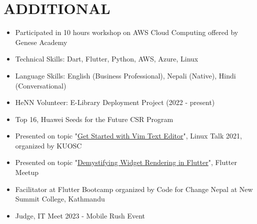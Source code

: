 \documentclass[a4paper,8pt]{article}
\begin{document}
\section{\textbf{ADDITIONAL}}
\begin{minipage}[t]{\linewidth}
    \begin{itemize}[nosep,after=\strut, leftmargin=1em, itemsep=2pt]
        \item Participated in 10 hours workshop on AWS Cloud Computing offered by Genese Academy
        \item Technical Skills: Dart, Flutter, Python, AWS, Azure, Linux 
        \item Language Skills: English (Business Professional), Nepali (Native), Hindi (Conversational)
        \item HeNN Volunteer: E-Library Deployment Project (2022 - present) 
        \item Top 16, Huawei Seeds for the Future CSR Program
        \item Presented on topic "\underline{\href{https://www.youtube.com/watch?v=9e-R4zM3XhA}{Get Started with Vim Text Editor}}", Linux Talk 2021, organized by KUOSC
        \item Presented on topic "\underline{\href{https://www.youtube.com/watch?v=fx1BG-Mudko}{Demystifying Widget Rendering in Flutter}}", Flutter Meetup
        \item Facilitator at Flutter Bootcamp organized by Code for Change Nepal at New Summit College, Kathmandu
        \item Judge, IT Meet 2023 - Mobile Rush Event
    \end{itemize}
\end{minipage}
\end{document}
